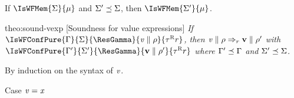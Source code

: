 \begin{lemma}\label{lem:lessSigma}
If $\IsWFMem{\Sigma}{\mem}$ and $\Sigma'\preceq\Sigma$, then  $\IsWFMem{\Sigma'}{\mem}$.
\end{lemma}
\epa

\begin{proofOf}{theo:sound-vexp} [Soundness for value expressions]
{\em If $\IsWFConfPure{\Gamma}{\Sigma}{\ResGamma}{\VConf{\ve}{\env}}{\Graded{\tau}{\Rgr}{\rgr}}$,  then $\mathit{v}\parallel\rho\Rightarrow_{r}\mathbf{v}\parallel\rho'$ with $\IsWFConfPure{\Gamma'}{\Sigma'}{\ResGamma}{\VConf{\val}{\env'}}{\Graded{\tau}{\Rgr}{\rgr}}$
\bpa where  $\Gamma'\preceq\Gamma$ and $\Sigma'\preceq\Sigma$. \epa
 }

\smallskip\noindent
By induction on the syntax of $\mathit{v}$.
\begin{description}
\item [Case $\mathit{v}=\mathit{x}$]\


\end{description}
\end{proofOf}
